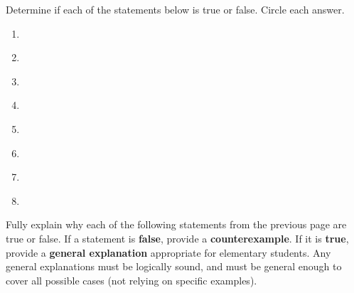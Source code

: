 
Determine if each of the statements below is true or false. Circle each answer.\\

\begin{enumerate}

    \item {}\\[4ex]

    \item {}\\[4ex]

    \item {}\\[4ex]

    \item {}\\[4ex]

    \item {}\\[4ex]

    \item {}\\[4ex]

    \item {}\\[4ex]

    \item {}\\[4ex]

\end{enumerate}

\newpage


Fully explain why each of the following statements from the previous page are true or false. If a statement is \textbf{\textcolor{BrickRed}{false}}, provide a \textbf{\textcolor{BrickRed}{counterexample}}. If it is \textbf{\textcolor{OliveGreen}{true}}, provide a \textbf{\textcolor{OliveGreen}{general explanation}} appropriate for elementary students. Any general explanations must be logically sound, and must be general enough to cover all possible cases (not relying on specific examples).

